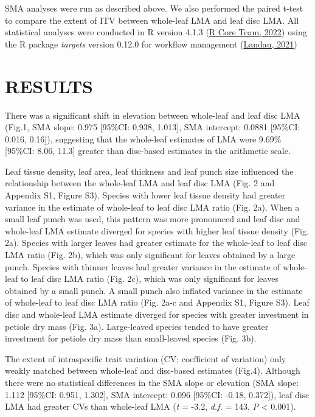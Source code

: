 \documentclass[
  12pt,
  a4paper,
,tablecaptionabove
]{scrartcl}
\begin{document}
SMA analyses were run as described above.
We also performed the paired t-test to compare the extent of ITV between whole-leaf LMA and leaf disc LMA.
All statistical analyses were conducted in R version 4.1.3 (\protect\hyperlink{ref-RCoreTeam2022}{R Core Team, 2022}) using the R package \emph{targets} version 0.12.0 for workflow management (\protect\hyperlink{ref-Landau2021}{Landau, 2021})

\hypertarget{results}{%
\section{RESULTS}\label{results}}

There was a significant shift in elevation between whole-leaf and leaf disc LMA (Fig.1, SMA slope: 0.975 {[}95\%CI: 0.938, 1.013{]}, SMA intercept: 0.0881 {[}95\%CI: 0.016, 0.16{]}), suggesting that the whole-leaf estimates of LMA were 9.69\% {[}95\%CI: 8.06, 11.3{]} greater than disc-based estimates in the arithmetic scale.

Leaf tissue density, leaf area, leaf thickness and leaf punch size influenced the relationship between the whole-leaf LMA and leaf disc LMA (Fig. 2 and Appendix S1, Figure S3).
Species with lower leaf tissue density had greater variance in the estimate of whole-leaf to leaf disc LMA ratio (Fig. 2a).
When a small leaf punch was used, this pattern was more pronounced and leaf disc and whole-leaf LMA estimate diverged for species with higher leaf tissue density (Fig. 2a).
Species with larger leaves had greater estimate for the whole-leaf to leaf disc LMA ratio (Fig. 2b), which was only significant for leaves obtained by a large punch.
Species with thinner leaves had greater variance in the estimate of whole-leaf to leaf disc LMA ratio (Fig. 2c), which was only significant for leaves obtained by a small punch.
A small punch also inflated variance in the estimate of whole-leaf to leaf disc LMA ratio (Fig. 2a-c and Appendix S1, Figure S3).
Leaf disc and whole-leaf LMA estimate diverged for species with greater investment in petiole dry mass (Fig. 3a). Large-leaved species tended to have greater investment for petiole dry mass than small-leaved species (Fig. 3b).

The extent of intraspecific trait variation (CV; coefficient of variation) only weakly matched between whole-leaf and disc-based estimates (Fig.4).
Although there were no statistical differences in the SMA slope or elevation (SMA slope: 1.112 {[}95\%CI: 0.951, 1.302{]}, SMA intercept: 0.096 {[}95\%CI: -0.18, 0.372{]}), leaf disc LMA had greater CVs than whole-leaf LMA (\emph{t} = -3.2, \emph{d.f.} = 143, \emph{P} \textless{} 0.001).
\end{document}
